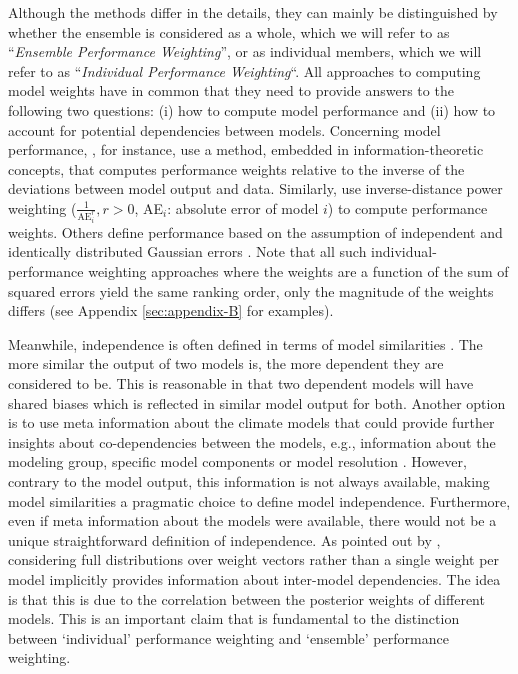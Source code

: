 Although the methods differ in the details, they can mainly be distinguished by whether the ensemble is considered as a whole, which we will refer to as ``\emph{Ensemble Performance Weighting}'', or as individual members, which we will refer to as ``\emph{Individual Performance Weighting}``.
All approaches to computing model weights have in common that they need to provide answers to the following two questions: (i) how to compute model performance and (ii) how to account for potential dependencies between models.
Concerning model performance, \citet{sierraInformationtheoreticApproachObtain2025}, for instance, use a method, embedded in information-theoretic concepts, that computes performance weights relative to the inverse of the deviations between model output and data. Similarly, \citet{fengComparisonFourEnsemble2011} use inverse-distance power weighting ($\frac{1}{\textrm{AE}_i^r}, r>0$, AE$_i$: absolute error of model $i$) to compute performance weights. 
Others define performance based on the assumption of independent and identically distributed Gaussian errors \citep[e.g.~][]{brunnerReducedGlobalWarming2020}.
Note that all such individual-performance weighting approaches where the weights are a function of the sum of squared errors yield the same ranking order, only the magnitude of the weights differs (see Appendix \ref{sec:appendix-B} for examples).

Meanwhile, independence is often defined in terms of model similarities \citep[e.g.~see][]{brunnerReducedGlobalWarming2020}. The more similar the output of two models is, the more dependent they are considered to be. This is reasonable in that two dependent models will have shared biases which is reflected in similar model output for both. 
Another option is to use meta information about the climate models that could provide further insights about co-dependencies between the models, e.g., information about the modeling group, specific model components or model resolution  \citep[e.g.~see][]{boeInterdependencyMultimodelClimate2018, kumaClimateModelCode2023}. 
However, contrary to the model output, this information is not always available, making model similarities a pragmatic choice to define model independence. Furthermore, even if meta information about the models were available, there would not be a unique straightforward definition of independence. As pointed out by \citet{massoudBayesianWeightingClimate2023}, considering full distributions over weight vectors rather than a  single weight per model implicitly provides information about inter-model dependencies. The idea is that this is due to the correlation between the posterior weights of different models. This is an important claim that is fundamental to the distinction between ‘individual’ performance weighting and ‘ensemble’ performance weighting. 

